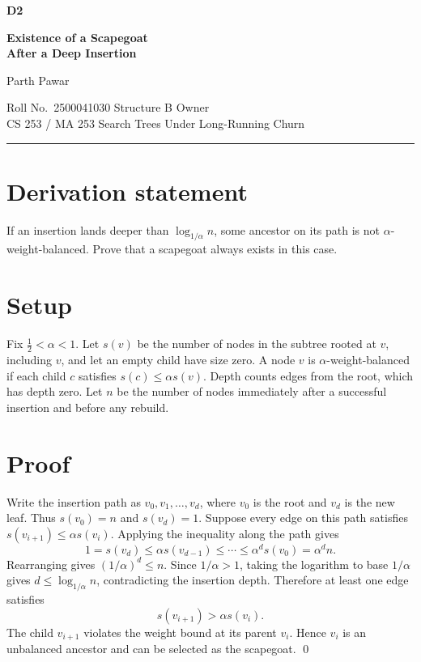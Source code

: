 \documentclass[11pt,a4paper]{article}
\begin{document}
{\centering
  {\large\bfseries D2\par}
  \vspace{5pt}
  {\LARGE\bfseries Existence of a Scapegoat\\[2pt] After a Deep Insertion\par}
  \vspace{9pt}
  {\large Parth Pawar\par}
  \vspace{2pt}
  Roll No.\ 2500041030 \textbar{} Structure B Owner\\
  CS 253 / MA 253 \textbar{} Search Trees Under Long-Running Churn
  \par\vspace{8pt}
  \rule{35mm}{0.35pt}
\par}
\vspace{6pt}

\section*{Derivation statement}

If an insertion lands deeper than \(\log_{1/\alpha} n\), some ancestor
on its path is not \(\alpha\)-weight-balanced. Prove that a scapegoat
always exists in this case.

\section{Setup}

Fix \(\tfrac12<\alpha<1\). Let \(s(v)\) be the number of nodes in the
subtree rooted at \(v\), including \(v\), and let an empty child have
size zero. A node \(v\) is \(\alpha\)-weight-balanced if each child \(c\)
satisfies \(s(c)\leq\alpha s(v)\). Depth counts edges from the root,
which has depth zero. Let \(n\) be the number of nodes immediately after
a successful insertion and before any rebuild.

\section{Proof}

Write the insertion path as \(v_0,v_1,\ldots,v_d\), where \(v_0\)
is the root and \(v_d\) is the new leaf. Thus \(s(v_0)=n\) and
\(s(v_d)=1\). Suppose every edge on this path satisfies
\(s(v_{i+1})\leq\alpha s(v_i)\). Applying the inequality along the path
gives
\[
  1=s(v_d)\leq\alpha s(v_{d-1})
    \leq\cdots\leq\alpha^d s(v_0)=\alpha^d n.
\]
Rearranging gives \((1/\alpha)^d\leq n\). Since \(1/\alpha>1\), taking
the logarithm to base \(1/\alpha\) gives \(d\leq\log_{1/\alpha}n\),
contradicting the insertion depth. Therefore at least one edge satisfies
\[
  s(v_{i+1})>\alpha s(v_i).
\]
The child \(v_{i+1}\) violates the weight bound at its parent \(v_i\).
Hence \(v_i\) is an unbalanced ancestor and can be selected as the scapegoat.
\qed
\end{document}
